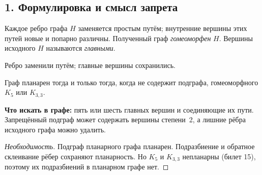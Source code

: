 \begingroup
\setlength{\parskip}{4pt}

\subsection*{1. Формулировка и смысл запрета}
\hypertarget{pk:step1}{}
\begin{definition}
Каждое ребро графа \(H\) заменяется простым путём; внутренние вершины
этих путей новые и попарно различны. Полученный граф \emph{гомеоморфен}
\(H\). Вершины исходного \(H\) называются \emph{главными}.
\end{definition}

\begin{center}

{\small Ребро заменили путём; главные вершины сохранились.}
\end{center}

\begin{theorem}
Граф планарен тогда и только тогда, когда не содержит подграфа,
гомеоморфного \(K_5\) или \(K_{3,3}\).
\end{theorem}
\textbf{Что искать в графе:} пять или шесть главных вершин и соединяющие
их пути. Запрещённый подграф может содержать вершины степени~2,
а лишние рёбра исходного графа можно удалить.

\begin{proof}[Необходимость]
Подграф планарного графа планарен. Подразбиение и обратное склеивание
рёбер сохраняют планарность. Но \(K_5\) и \(K_{3,3}\) непланарны
(билет 15), поэтому их подразбиений в планарном графе нет.
\end{proof}



